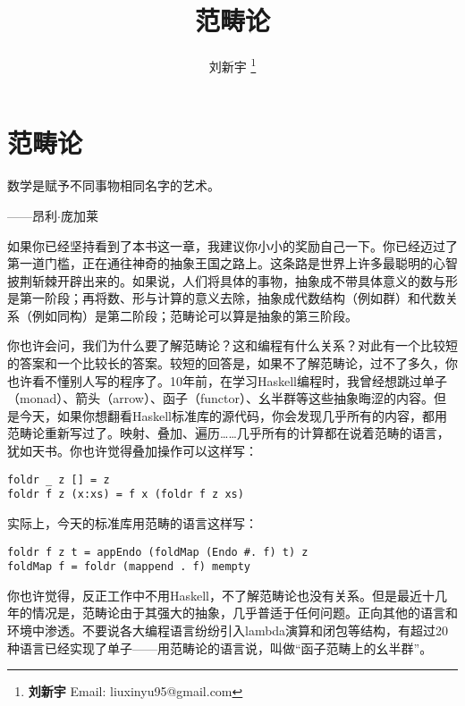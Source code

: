 \documentclass{article}
\begin{document}
\title{范畴论}

\author{刘新宇
\thanks{{\bfseries 刘新宇} \newline
  Email: liuxinyu95@gmail.com \newline}
  }

\maketitle
\fi


\ifx\wholebook\relax
\chapter{范畴论}
\fi

\epigraph{数学是赋予不同事物相同名字的艺术。}{——昂利$\cdot$庞加莱}


如果你已经坚持看到了本书这一章，我建议你小小的奖励自己一下。你已经迈过了第一道门槛，正在通往神奇的抽象王国之路上。这条路是世界上许多最聪明的心智披荆斩棘开辟出来的。如果说，人们将具体的事物，抽象成不带具体意义的数与形是第一阶段；再将数、形与计算的意义去除，抽象成代数结构（例如群）和代数关系（例如同构）是第二阶段；范畴论可以算是抽象的第三阶段。

你也许会问，我们为什么要了解范畴论？这和编程有什么关系？对此有一个比较短的答案和一个比较长的答案。较短的回答是，如果不了解范畴论，过不了多久，你也许看不懂别人写的程序了。10年前，在学习Haskell编程时，我曾经想跳过单子（monad）、箭头（arrow）、函子（functor）、幺半群等这些抽象晦涩的内容。但是今天，如果你想翻看Haskell标准库的源代码，你会发现几乎所有的内容，都用范畴论重新写过了。映射、叠加、遍历……几乎所有的计算都在说着范畴的语言，犹如天书。你也许觉得叠加操作可以这样写：

\lstset{language=Haskell, frame=single}
 \begin{lstlisting}
foldr _ z [] = z
foldr f z (x:xs) = f x (foldr f z xs)
\end{lstlisting}

实际上，今天的标准库用范畴的语言这样写：

\begin{lstlisting}
foldr f z t = appEndo (foldMap (Endo #. f) t) z
foldMap f = foldr (mappend . f) mempty
\end{lstlisting}

你也许觉得，反正工作中不用Haskell，不了解范畴论也没有关系。但是最近十几年的情况是，范畴论由于其强大的抽象，几乎普适于任何问题。正向其他的语言和环境中渗透。不要说各大编程语言纷纷引入lambda演算和闭包等结构，有超过20种语言已经实现了单子\cite{Monad-Haskell-Wiki}——用范畴论的语言说，叫做“函子范畴上的幺半群”。
\end{document}
